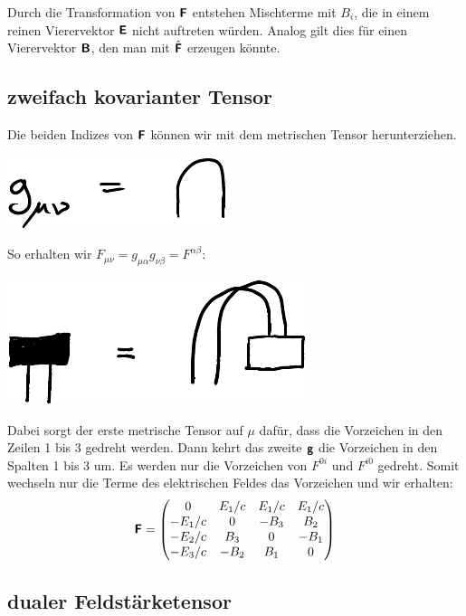 Durch die Transformation von $\boldsymbol{\mathsf{F}}$ entstehen Mischterme mit $B_i$, die in
einem reinen Vierervektor $\boldsymbol{\mathsf{E}}$ nicht auftreten würden. Analog gilt dies
für einen Vierervektor $\boldsymbol{\mathsf{B}}$, den man mit $\hat{\boldsymbol{\mathsf{F}}}$ erzeugen könnte.

\subsection{zweifach kovarianter Tensor}

Die beiden Indizes von $\boldsymbol{\mathsf{F}}$ können wir mit dem metrischen Tensor
herunterziehen.
\begin{center}
	\includegraphics{H1-Penrose-5-crop.pdf}
\end{center}

So erhalten wir $F_{\mu\nu} = g_{\mu\alpha} g_{\nu\beta} = F^{\alpha\beta}$:
\begin{center}
	\includegraphics{H1-Penrose-10-crop.pdf}
\end{center}

Dabei sorgt der erste metrische Tensor auf $\mu$ dafür, dass die Vorzeichen in
den Zeilen 1 bis 3 gedreht werden. Dann kehrt das zweite $\boldsymbol{\mathsf{g}}$ die
Vorzeichen in den Spalten 1 bis 3 um. Es werden nur die Vorzeichen
von $F^{0i}$ und $F^{i0}$ gedreht. Somit wechseln nur die Terme des
elektrischen Feldes das Vorzeichen und wir erhalten:
\[
	\boldsymbol{\mathsf{F}}
	=
	\begin{pmatrix}
		0 & E_1/c & E_1/c & E_1/c \\
		-E_1/c & 0 & -B_3 & B_2 \\
		-E_2/c & B_3 & 0 & -B_1 \\
		-E_3/c & -B_2 & B_1 & 0 \\
	\end{pmatrix}
\]

\subsection{dualer Feldstärketensor}

